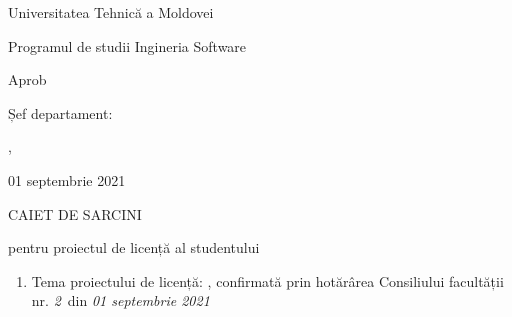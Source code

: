 \newcommand{\studyprogramname}{Programul de studii Ingineria Software}
\newcommand{\councilnr}{2}
\newcommand{\councildate}{01 septembrie 2021}
\newcommand{\thesisdeadline}{31 mai 2022}
\newcommand{\taskdate}{01 septembrie 2021}


\begin{titlepage}
	\begin{titlepagefont}
	    \centering
	    \bfseries

        {\large Universitatea Tehnică a Moldovei \par}
        \bigskip
        
        \begin{minipage}{0.75\textwidth}
            {\facultyname \par}
            {\departmentname \par}
            {\studyprogramname \par}            
        \end{minipage}


    	\vfill
    	
    	\hfill
    	\begin{minipage}{0.35\textwidth}
    	    \raggedleft
        	{\small Aprob \par}
        	{\small Șef departament: \par}
        	{\small \departmentchiefname, \departmentchieftitle \par}
        	\bigskip
        	{\small \dotfill \par}
        	{\small \councildate \par}
        \end{minipage}
    	
    	\vfill
    	
    	{\large CAIET DE SARCINI \par}
    	{\large pentru proiectul de licență al studentului \par}
    	{\large \studentname \par}
    	
    	\vfill
    	
        \begin{enumerate}[label=\arabic*.]
        
            \item Tema proiectului de licență: \emph{\thesistitleen},
            confirmată prin hotărârea Consiliului facultății nr. \emph{\councilnr}\ din \emph{\councildate}
            

\end{enumerate}
\end{titlepagefont}
\end{titlepage}
